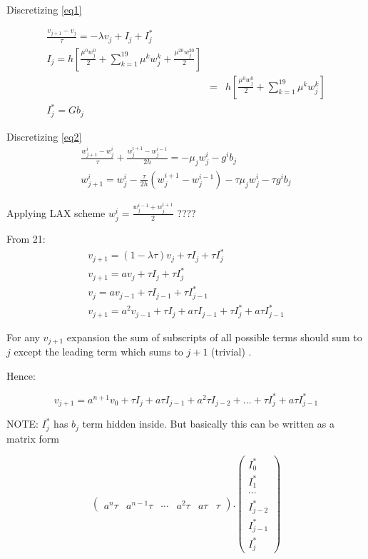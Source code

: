 \documentclass{ifacconf}
\begin{document}
Discretizing \ref{eq1}

\begin{eqnarray}
\frac{v_{j+1}-v_j}{\tau} = -\lambda v_j + I_j + I_j^{*} \\
I_j = h[\frac{\mu^0 w_j^0}{2} + \sum_{k=1}^{19} \mu^k w_j^k + \frac{\mu^{20} w_j^{20}}{2} ] \\
&=&  h[\frac{\mu^0 w_j^0}{2} + \sum_{k=1}^{19} \mu^k w_j^k ] \nonumber \\
I_j^{*} = Gb_j
\end{eqnarray}


Discretizing \ref{eq2}
\begin{eqnarray}
\frac{w_{j+1}^i-w_{j}^i}{\tau} + \frac{w_j^{i+1}-w_j^{i-1}}{2h} = -\mu_jw_j^i - g^ib_j \nonumber\\
w_{j+1}^i=w_{j}^i-\frac{\tau}{2h}(w_j^{i+1}-w_j^{i-1})-\tau\mu_j w_j^i - \tau g^i b_j
\end{eqnarray}

Applying LAX scheme $w_j^i = \frac{w_j^{i-1} + w_j^{i+1}}{2}$ ????


From 21:
\begin{eqnarray}
v_{j+1} = (1-\lambda \tau)v_j + \tau I_j + \tau I_j^{*} \\
v_{j+1} = av_j + \tau I_j + \tau I_j^{*}\\
v_{j} = av_{j-1} + \tau I_{j-1} + \tau I_{j-1}^{*}\\
v_{j+1} = a^2v_{j-1} + \tau I_j + a\tau I_{j-1} + \tau I_{j}^{*} + a\tau I_{j-1}^{*} 
\end{eqnarray}


For any $v_{j+1}$ expansion the sum of subscripts of all possible terms should sum to $j$ except the leading term which sums to $j+1$ (trivial) .

Hence:

\begin{equation}
v_{j+1} = a^{n+1}v_0 + \tau I_j + a \tau I_{j-1} + a^2 \tau I_{j-2} + \ldots + \tau I_j^{*} + a\tau I_{j-1}^{*} 
\end{equation}


NOTE: $I_j^{*}$ has $b_j$ term hidden inside. But basically this can be written as a matrix form

\begin{equation}
\begin{pmatrix} a^{n}\tau & a^{n-1}\tau & \cdots & a^2\tau & a\tau& \tau \end{pmatrix} . \begin{pmatrix} I_0^{*} \\ I_1^{*} \\ \cdots \\ I_{j-2}^{*} \\ I_{j-1}^{*} \\ I_{j} ^{*}\end{pmatrix}
\end{equation}
\end{document}
